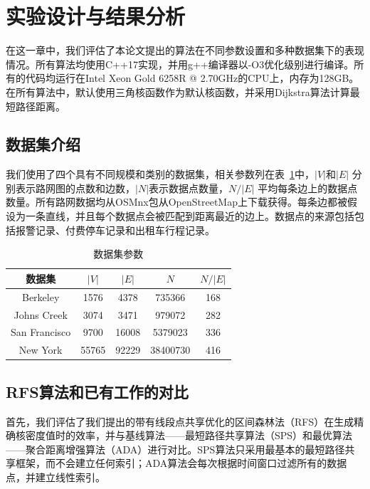 \section{实验设计与结果分析}
\label{sec8:exp}

在这一章中，我们评估了本论文提出的算法在不同参数设置和多种数据集下的表现情况。所有算法均使用C++17实现，并用g++编译器以-O3优化级别进行编译。所有的代码均运行在Intel Xeon Gold 6258R @ 2.70GHz的CPU上，内存为128GB。在所有算法中，默认使用三角核函数作为默认核函数，并采用Dijkstra算法计算最短路径距离。

\subsection{数据集介绍}

我们使用了四个具有不同规模和类别的数据集，相关参数列在表~\ref{tab:datasets}中，$\vert V \vert$和$\vert E \vert$ 分别表示路网图的点数和边数，$\vert N \vert$表示数据点数量，$N / \vert E \vert$ 平均每条边上的数据点数量。所有路网数据均从OSMnx包从OpenStreetMap上下载获得。每条边都被假设为一条直线，并且每个数据点会被匹配到距离最近的边上。数据点的来源包括包括报警记录、付费停车记录和出租车行程记录。

\begin{table}[h]
\centering
\def\arraystretch{1.5}
\caption{数据集参数}
\label{tab:datasets}
\begin{tabular}{c|c|c|c|c} 
\hline
数据集     & $\vert V \vert$ & $\vert E \vert$ & $N$ & $N / \vert E \vert$  \\ 
\hline \hline
Berkeley    & 1576            & 4378            & 735366          & 168                              \\ 
\hline
Johns Creek & 3074            & 3471            & 979072          & 282                              \\ 
\hline
San Francisco  & 9700         & 16008           & 5379023         & 336                              \\ 
\hline
New York	& 55765           & 92229           & 38400730        & 416                              \\ 
\hline
\end{tabular}
\end{table}

\subsection{RFS算法和已有工作的对比}

首先，我们评估了我们提出的带有线段点共享优化的区间森林法（RFS）在生成精确核密度值时的效率，并与基线算法——最短路径共享算法（SPS）和最优算法——聚合距离增强算法（ADA）进行对比。SPS算法只采用最基本的最短路径共享框架，而不会建立任何索引；ADA算法会每次根据时间窗口过滤所有的数据点，并建立线性索引。

